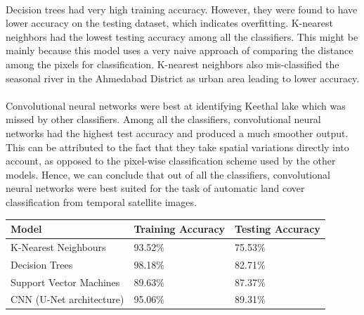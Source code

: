 \documentclass[12pt, a4paper]{report}
\begin{document}
\paragraph{}
Decision trees had very high training accuracy. However, they were found to have lower accuracy on the testing dataset, which indicates overfitting. K-nearest neighbors had the lowest testing accuracy among all the classifiers. This might be mainly because this model uses a very naive approach of comparing the distance among the pixels for classification. K-nearest neighbors also mis-classified the seasonal river in the Ahmedabad District as urban area leading to lower accuracy.
\paragraph{}
Convolutional neural networks were best at identifying Keethal lake which was missed by other classifiers. Among all the classifiers, convolutional neural networks had the highest test accuracy and produced a much smoother output. This can be attributed to the fact that they take spatial variations directly into account, as opposed to the pixel-wise classification scheme used by the other models. Hence, we can conclude that out of all the classifiers, convolutional neural networks were best suited for the task of automatic land cover classification from temporal satellite images.

\begin{center}
\begin{tabular}{|p{5cm}|p{5cm}|p{5cm}|}
\hline
\textbf{Model} & \textbf{Training Accuracy} & \textbf{Testing Accuracy} \\
\hline
K-Nearest Neighbours & 93.52\% & 75.53\%\\
\hline
Decision Trees & 98.18\% & 82.71\%\\
\hline
Support Vector Machines & 89.63\% & 87.37\%\\
\hline
CNN (U-Net architecture) & 95.06\% & 89.31\%\\
\hline
\end{tabular} 
\end{center}
\end{document}
